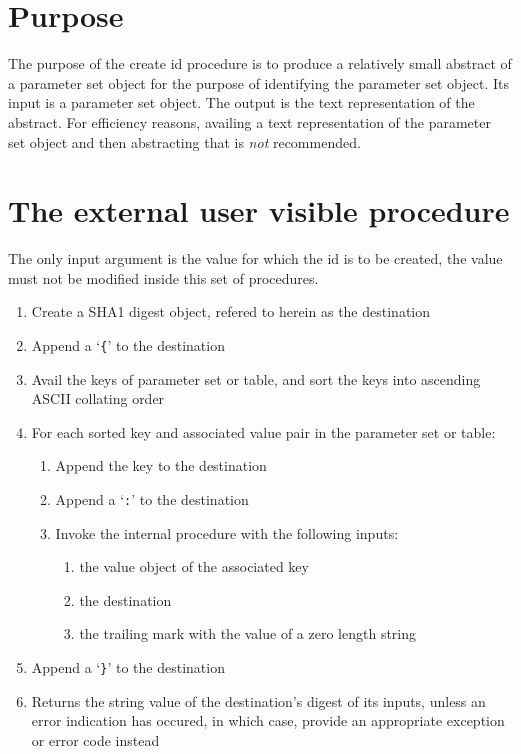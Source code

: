 \documentclass[12pt]{article}
\begin{document}
\section*{Purpose}
The purpose of the create id procedure is to produce
a relatively small abstract of a parameter set object
for the purpose of identifying the parameter set object.
Its input is a parameter set object.
The output is the text representation of the abstract.
For efficiency reasons, availing a text representation
of the parameter set object and then abstracting that
is {\em not} recommended.

\section*{The external user visible procedure}
The only input argument is the value for which the id is to be created,
the value must not be modified inside this set of procedures.

\begin{enumerate}
\item Create a SHA1 digest object, refered to herein as the destination

\item Append a `\verb+{+' to the destination

\item Avail the keys of parameter set or table, and sort the keys into 
      ascending ASCII collating order

\item For each sorted key and associated value pair in the parameter set
      or table:

  \begin{enumerate}
  \item Append the key to the destination
  \item Append a `\verb+:+' to the destination
  \item Invoke the internal procedure with the following inputs:
    \begin{enumerate}
    \item the value object of the associated key
    \item the destination
    \item the trailing mark with the value of a zero length string
    \end{enumerate}
  \end{enumerate}

\item Append a `\verb+}+' to the destination

\item Returns the string value of the destination's digest of its inputs, 
      unless an error indication has occured, in which case, provide an
      appropriate exception or error code instead
\end{enumerate}
\end{document}
